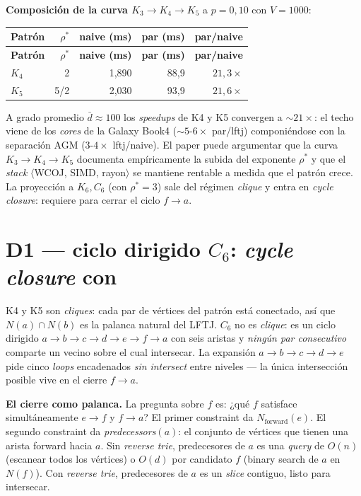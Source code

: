 \documentclass[11pt,a4paper]{report}
\newcommand{\code}[1]{\texttt{\detokenize{#1}}}
\begin{document}
\textbf{Composición de la curva $K_3 \to K_4 \to K_5$} a $p=0{,}10$ con $V=1000$:

\begin{longtable}{lrrrr}
\toprule
\textbf{Patrón} & $\rho^*$ & \textbf{naive (ms)} & \textbf{par (ms)} & \textbf{par/naive} \\
\midrule
\endfirsthead
\toprule
\textbf{Patrón} & $\rho^*$ & \textbf{naive (ms)} & \textbf{par (ms)} & \textbf{par/naive} \\
\midrule
\endhead
$K_4$ & 2     & 1{,}890 & 88{,}9 & $21{,}3\times$ \\
$K_5$ & 5/2   & 2{,}030 & 93{,}9 & \textbf{$21{,}6\times$} \\
\bottomrule
\end{longtable}

A grado promedio $\bar d \approx 100$ los \emph{speedups} de K4 y K5 convergen a $\sim 21\times$: el techo viene de los \emph{cores} de la Galaxy Book4 ($\sim 5\text{-}6\times$ par/lftj) componiéndose con la separación AGM ($3\text{-}4\times$ lftj/naive). El paper puede argumentar que la curva $K_3 \to K_4 \to K_5$ documenta empíricamente la subida del exponente $\rho^*$ y que el \emph{stack} $\langle$WCOJ, SIMD, rayon$\rangle$ se mantiene rentable a medida que el patrón crece. La proyección a $K_6, C_6$ (con $\rho^*=3$) sale del régimen \emph{clique} y entra en \emph{cycle closure}: requiere \code{ReverseCsrTrie} para cerrar el ciclo $f \to a$.

\chapter{D1 --- ciclo dirigido $C_6$: \emph{cycle closure} con \code{ReverseCsrTrie}}

K4 y K5 son \emph{cliques}: cada par de vértices del patrón está conectado, así que $N(a) \cap N(b)$ es la palanca natural del LFTJ. $C_6$ no es \emph{clique}: es un ciclo dirigido $a \to b \to c \to d \to e \to f \to a$ con seis aristas y \emph{ningún par consecutivo} comparte un vecino sobre el cual intersecar. La expansión $a \to b \to c \to d \to e$ pide cinco \emph{loops} encadenados \emph{sin} \emph{intersect} entre niveles --- la única intersección posible vive en el cierre $f \to a$.

\textbf{El cierre como palanca.} La pregunta sobre $f$ es: ¿qué $f$ satisface simultáneamente $e \to f$ y $f \to a$? El primer constraint da $N_\mathrm{forward}(e)$. El segundo constraint da \emph{predecessors}$(a)$: el conjunto de vértices que tienen una arista forward hacia $a$. Sin \emph{reverse trie}, predecesores de $a$ es una \emph{query} de $O(n)$ (escanear todos los vértices) o $O(d)$ por candidato $f$ (binary search de $a$ en $N(f)$). Con \emph{reverse trie}, predecesores de $a$ es un \emph{slice} contiguo, listo para intersecar.
\end{document}
